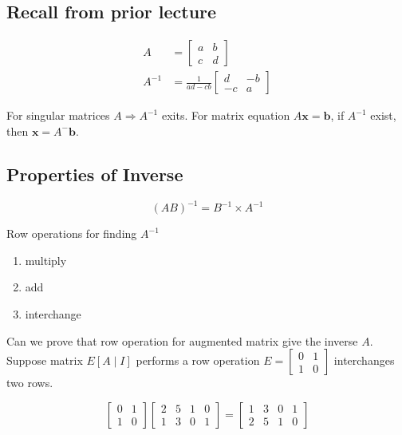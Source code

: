 \documentclass[main.tex]{subfiles}
\begin{document}
\subsection{Recall from prior lecture}

    $$
    \begin{aligned}
    A & =\left[\begin{array}{ll}
    a & b \\
    c & d
    \end{array}\right] \\
    A^{-1} & =\frac{1}{a d-c b}\left[\begin{array}{cc}
    d & -b \\
    -c & a
    \end{array}\right]
    \end{aligned}
    $$

    For singular matrices $A \Rightarrow A^{-1}$ exits. For matrix equation $A \bm{x}=\bm{b}$, if $A^{-1}$ exist, then $\bm{x}=A^{-} \bm{b}$.

\subsection{Properties of Inverse}

    $$
    (A B)^{-1}=B^{-1} \times A^{-1}
    $$

    Row operations for finding $A^{-1}$
    \begin{enumerate}
        \item multiply
        \item add
        \item interchange
    \end{enumerate}

    Can we prove that row operation for augmented matrix give the inverse $A$. Suppose matrix $E[A \mid I]$ performs a row operation $E=\left[\begin{array}{ll}0 & 1 \\ 1 & 0\end{array}\right]$ interchanges two rows.

    $$
    \left[\begin{array}{ll}
    0 & 1 \\
    1 & 0
    \end{array}\right]\left[\begin{array}{ll|ll}
    2 & 5 & 1 & 0 \\
    1 & 3 & 0 & 1
    \end{array}\right]=\left[\begin{array}{ll|ll}
    1 & 3 & 0 & 1 \\
    2 & 5 & 1 & 0
    \end{array}\right]
    $$
\end{document}
